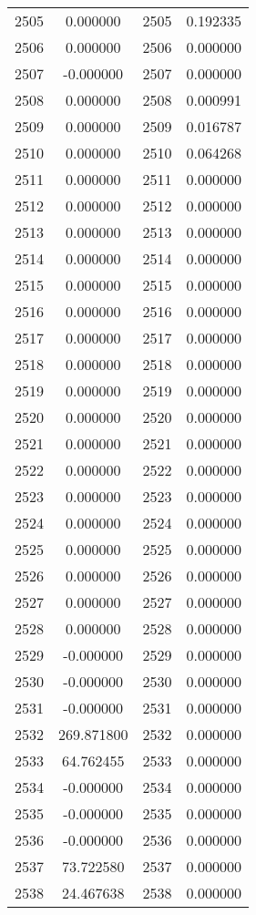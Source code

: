 \documentclass[12pt]{article}
\begin{document}
\begin{longtable}{@{}cccc@{}}
2505 & 0.000000 & 2505 & 0.192335 \\
2506 & 0.000000 & 2506 & 0.000000 \\
2507 & -0.000000 & 2507 & 0.000000 \\
2508 & 0.000000 & 2508 & 0.000991 \\
2509 & 0.000000 & 2509 & 0.016787 \\
2510 & 0.000000 & 2510 & 0.064268 \\
2511 & 0.000000 & 2511 & 0.000000 \\
2512 & 0.000000 & 2512 & 0.000000 \\
2513 & 0.000000 & 2513 & 0.000000 \\
2514 & 0.000000 & 2514 & 0.000000 \\
2515 & 0.000000 & 2515 & 0.000000 \\
2516 & 0.000000 & 2516 & 0.000000 \\
2517 & 0.000000 & 2517 & 0.000000 \\
2518 & 0.000000 & 2518 & 0.000000 \\
2519 & 0.000000 & 2519 & 0.000000 \\
2520 & 0.000000 & 2520 & 0.000000 \\
2521 & 0.000000 & 2521 & 0.000000 \\
2522 & 0.000000 & 2522 & 0.000000 \\
2523 & 0.000000 & 2523 & 0.000000 \\
2524 & 0.000000 & 2524 & 0.000000 \\
2525 & 0.000000 & 2525 & 0.000000 \\
2526 & 0.000000 & 2526 & 0.000000 \\
2527 & 0.000000 & 2527 & 0.000000 \\
2528 & 0.000000 & 2528 & 0.000000 \\
2529 & -0.000000 & 2529 & 0.000000 \\
2530 & -0.000000 & 2530 & 0.000000 \\
2531 & -0.000000 & 2531 & 0.000000 \\
2532 & 269.871800 & 2532 & 0.000000 \\
2533 & 64.762455 & 2533 & 0.000000 \\
2534 & -0.000000 & 2534 & 0.000000 \\
2535 & -0.000000 & 2535 & 0.000000 \\
2536 & -0.000000 & 2536 & 0.000000 \\
2537 & 73.722580 & 2537 & 0.000000 \\
2538 & 24.467638 & 2538 & 0.000000 \\

\end{longtable}
\end{document}

